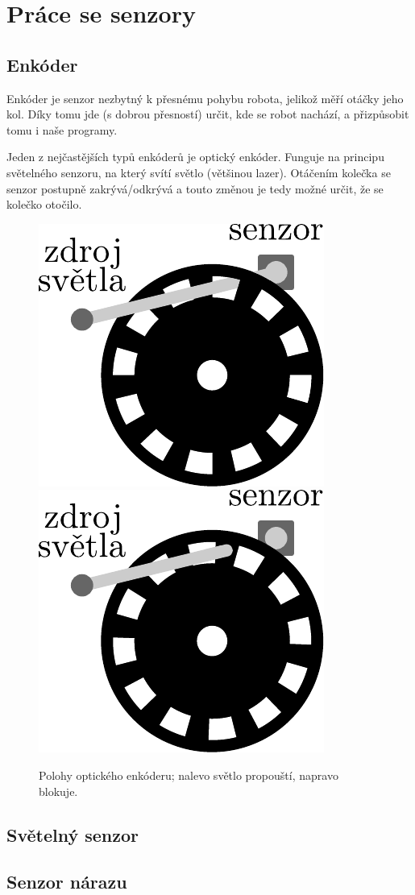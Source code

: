 \documentclass[../main.tex]{subfiles}
\begin{document}
	\section{Práce se senzory}

	\subsection{Enkóder}
	Enkóder je senzor nezbytný k přesnému pohybu robota, jelikož měří otáčky jeho kol. Díky tomu jde (s dobrou přesností) určit, kde se robot nachází, a přizpůsobit tomu i naše programy.

	Jeden z nejčastějších typů enkóderů je optický enkóder. Funguje na principu světelného senzoru, na který svítí světlo (většinou lazer). Otáčením kolečka se senzor postupně zakrývá/odkrývá a touto změnou je tedy možné určit, že se kolečko otočilo.

	\begin{figure}[h!]%
		\centering%
		\includegraphics[width=0.25\linewidth]{../Images/03/encoder-through.pdf}
		\hspace{.15\textwidth}%
		\includegraphics[width=0.25\linewidth]{../Images/03/encoder-blocked.pdf}
		\caption{Polohy optického enkóderu; nalevo světlo propouští, napravo blokuje.}
	\end{figure}

	\subsection{Světelný senzor}

	\subsection{Senzor nárazu}
\end{document}
